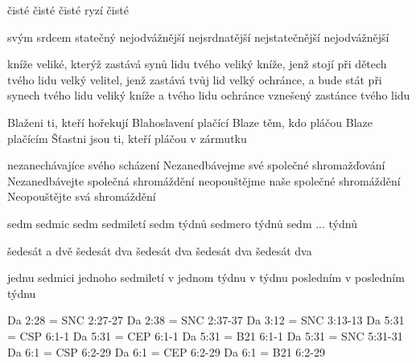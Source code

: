        
        {čisté}  %
        {čisté}  %
        {čisté}  %
        {ryzí}  %
        {čisté}  %
          
         

        {svým srdcem statečný}  %
        {nejodvážnější}  %
        {nejsrdnatější}  %
        {nejstatečnější}  %
        {nejodvážnější}  %
          
        
\vdef   
    {kníže veliké, kterýž zastává synů lidu tvého}   %
    {veliký kníže, jenž stojí při dětech tvého lidu}   %
    {velký velitel, jenž zastává tvůj lid}   %
    {velký ochránce, a bude stát při synech tvého lidu}   %
    {veliký kníže a tvého lidu ochránce}   %
    {vznešený zastánce tvého lidu}   %
        




        {Blaženi ti, kteří hořekují}
        {Blahoslavení plačící}
        {Blaze těm, kdo pláčou}
        {Blaze plačícím}
        {Šťastni jsou ti, kteří pláčou v zármutku}
          









      {nezanechávajíce svého scházení} %
      {Nezanedbávejme své společné shromažďování} %
      {Nezanedbávejte společná shromáždění} %
      {neopouštějme naše společné shromáždění} %
      {Neopouštějte svá shromáždění} %


        {sedm sedmic}  %
        {sedm sedmiletí}  %
        {sedm týdnů}  %
        {sedmero týdnů}  %
        {sedm ... týdnů}  %

        {šedesát a dvě}  %
        {šedesát dva}  %
        {šedesát dva}  %
        {šedesát dva}  %
        {šedesát dva}  %
        
        {jednu sedmici}  %
        {jednoho sedmiletí}  %
        {v jednom týdnu}  %
        {v týdnu posledním}  %
        {v posledním týdnu}  %


\renum Da 2:28 = SNC 2:27-27
\renum Da 2:38 = SNC 2:37-37
\renum Da 3:12 = SNC 3:13-13
\renum Da 5:31 = CSP 6:1-1
\renum Da 5:31 = CEP 6:1-1
\renum Da 5:31 = B21 6:1-1
\renum Da 5:31 = SNC 5:31-31 
\renum Da 6:1 = CSP 6:2-29
\renum Da 6:1 = CEP 6:2-29
\renum Da 6:1 = B21 6:2-29

        

\endinput

\vdef   {}  %
        {}  %
        {}  %
        {}  %
        {}  %
        {}  %
        



